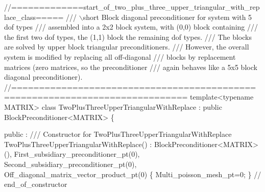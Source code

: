 \begin{DoxyCodeInclude}
\textcolor{comment}{//=============start\_of\_two\_plus\_three\_upper\_triangular\_with\_replace\_class=====}\textcolor{comment}{}
\textcolor{comment}{/// \(\backslash\)short Block diagonal preconditioner for system with 5 dof types}
\textcolor{comment}{/// assembled into a 2x2 block system, with (0,0) block containing}
\textcolor{comment}{/// the first two dof types, the (1,1) block the remaining dof types.}
\textcolor{comment}{/// The blocks are solved by upper block triangular preconditioners.}
\textcolor{comment}{/// However, the overall system is modified by replacing all off-diagonal }
\textcolor{comment}{/// blocks by replacement matrices (zero matrices, so the preconditioner }
\textcolor{comment}{/// again behaves like a 5x5 block diagonal preconditioner).}
\textcolor{comment}{}\textcolor{comment}{//=============================================================================}
 \textcolor{keyword}{template}<\textcolor{keyword}{typename} MATRIX> 
 \textcolor{keyword}{class }TwoPlusThreeUpperTriangularWithReplace : 
  \textcolor{keyword}{public} BlockPreconditioner<MATRIX>
 \{
  
 public :
  \textcolor{comment}{}
\textcolor{comment}{  /// Constructor for TwoPlusThreeUpperTriangularWithReplace}
\textcolor{comment}{}  TwoPlusThreeUpperTriangularWithReplace() : 
   BlockPreconditioner<MATRIX>(),
   First\_subsidiary\_preconditioner\_pt(0),
   Second\_subsidiary\_preconditioner\_pt(0),
   Off\_diagonal\_matrix\_vector\_product\_pt(0)
   \{    
    Multi\_poisson\_mesh\_pt=0;
   \} \textcolor{comment}{// end\_of\_constructor}
  

\end{DoxyCodeInclude}
